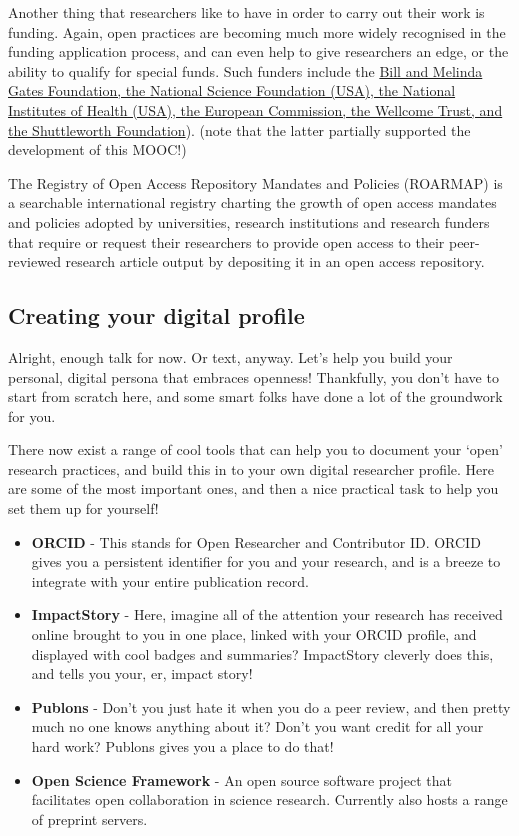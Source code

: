 \documentclass[]{book}
\begin{document}
{{{{Another thing that researchers like to have in order to carry out their work is funding. Again, open practices are becoming much more widely recognised in the funding application process, and can even help to give researchers an edge, or the ability to qualify for special funds. Such funders include the \href{http://whyopenresearch.org/funding}{Bill and Melinda Gates Foundation, the National Science Foundation (USA), the National Institutes of Health (USA), the European Commission, the Wellcome Trust, and the Shuttleworth Foundation}). (note that the latter partially supported the development of this MOOC!)

The Registry of Open Access Repository Mandates and Policies (ROARMAP) is a searchable international registry charting the growth of open access mandates and policies adopted by universities, research institutions and research funders that require or request their researchers to provide open access to their peer-reviewed research article output by depositing it in an open access repository.

\hypertarget{creating-your-digital-profile}{%
\subsection{Creating your digital profile }\label{creating-your-digital-profile}}

Alright, enough talk for now. Or text, anyway. Let's help you build your personal, digital persona that embraces openness! Thankfully, you don't have to start from scratch here, and some smart folks have done a lot of the groundwork for you.

There now exist a range of cool tools that can help you to document your `open' research practices, and build this in to your own digital researcher profile. Here are some of the most important ones, and then a nice practical task to help you set them up for yourself!

\begin{itemize}
\item
  \textbf{ORCID} - This stands for Open Researcher and Contributor ID. ORCID gives you a persistent identifier for you and your research, and is a breeze to integrate with your entire publication record.
\item
  \textbf{ImpactStory} - Here, imagine all of the attention your research has received online brought to you in one place, linked with your ORCID profile, and displayed with cool badges and summaries? ImpactStory cleverly does this, and tells you your, er, impact story!
\item
  \textbf{Publons} - Don't you just hate it when you do a peer review, and then pretty much no one knows anything about it? Don't you want credit for all your hard work? Publons gives you a place to do that!
\item
  \textbf{Open Science Framework} - An open source software project that facilitates open collaboration in science research. Currently also hosts a range of preprint servers.
\end{itemize}

}}}}
\end{document}
